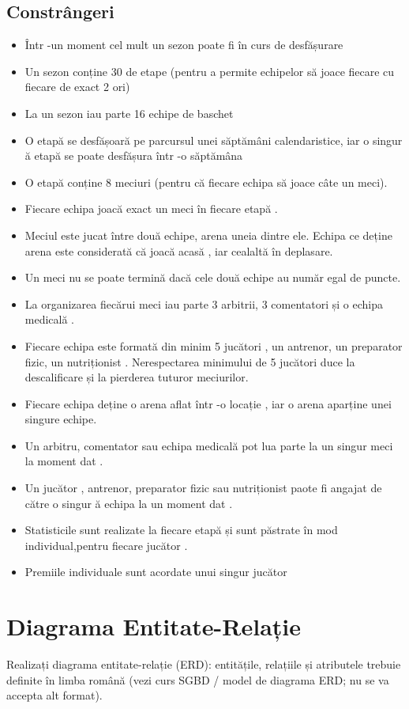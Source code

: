 \documentclass{article}
\begin{document}
\subsection{Constrângeri}
\begin{itemize}
	\item Într -un moment cel mult un sezon poate fi în curs de desfășurare 
	\item Un sezon conține 30 de etape (pentru a permite echipelor să joace fiecare cu fiecare de exact 2 ori) 
	\item La un sezon iau parte 16 echipe de baschet
	 \item O etapă se desfășoară pe parcursul unei săptămâni calendaristice, iar o singur ă etapă se poate desfășura într -o săptămâna 
	\item O etapă conține 8 meciuri (pentru că fiecare echipa să joace câte un meci). 
	\item Fiecare echipa joacă exact un meci în fiecare etapă . 
	\item Meciul este jucat între două echipe, arena uneia dintre ele. Echipa ce deține arena este considerată că joacă acasă , iar cealaltă în deplasare. 
	\item Un meci nu se poate termină dacă cele două echipe au număr egal de puncte. 
	\item La organizarea fiecărui meci iau parte 3 arbitrii, 3 comentatori și o echipa medicală . 
	\item Fiecare echipa este formată din minim 5 jucători , un antrenor, un preparator fizic, un nutriționist . Nerespectarea minimului de 5 jucători duce la descalificare și la pierderea tuturor meciurilor. 
	\item Fiecare echipa deține o arena aflat într -o locație , iar o arena aparține unei singure echipe. 
	\item Un arbitru, comentator sau echipa medicală pot lua parte la un singur meci la moment dat . 
	\item Un jucător , antrenor, preparator fizic sau nutriționist paote fi angajat de către o singur ă echipa la un moment dat .
	 \item Statisticile sunt realizate la fiecare etapă și sunt păstrate în mod individual,pentru fiecare jucător . 
	\item Premiile individuale sunt acordate unui singur jucător
	
\end{itemize}
\pagebreak
\section{Diagrama Entitate-Relație}
	Realizați diagrama entitate-relație (ERD): entitățile, relațiile și atributele trebuie definite în limba
	română (vezi curs SGBD / model de diagrama ERD; nu se va accepta alt format).
\end{document}
